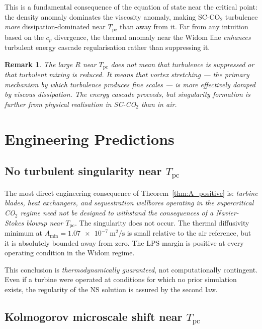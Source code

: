 \documentclass[12pt,a4paper]{article}
\newtheorem{remark}[theorem]{Remark}
\newcommand{\Tc}{T_{\mathrm{pc}}}   %
\newcommand{\Amin}{A_{\min}}
\newcommand{\sco}{SC-CO$_2$}
\begin{document}
This is a fundamental consequence of the equation of state near the critical point:
the density anomaly dominates the viscosity anomaly, making \sco{} turbulence
\emph{more} dissipation-dominated near $\Tc$ than away from it.  Far from any
intuition based on the $c_p$ divergence, the thermal anomaly near the Widom line
\emph{enhances} turbulent energy cascade regularisation rather than suppressing it.

\begin{remark}
  The large $R$ near $\Tc$ does not mean that turbulence is suppressed or that
  turbulent mixing is reduced.  It means that vortex stretching --- the primary
  mechanism by which turbulence produces fine scales --- is more effectively
  damped by viscous dissipation.  The energy cascade proceeds, but singularity
  formation is further from physical realisation in \sco{} than in air.
\end{remark}

\section{Engineering Predictions}
\label{sec:engineering}

\subsection{No turbulent singularity near $\Tc$}
\label{sec:engineering:regularity}

The most direct engineering consequence of Theorem~\ref{thm:A_positive} is:
\emph{turbine blades, heat exchangers, and sequestration wellbores operating
in the supercritical CO$_2$ regime need not be designed to withstand the
consequences of a Navier-Stokes blowup near $\Tc$}.  The singularity does not
occur.  The thermal diffusivity minimum at $\Amin = \SI{1.07e-7}{\metre\squared\per\second}$
is small relative to the air reference, but it is absolutely bounded away from zero.
The LPS margin is positive at every operating condition in the Widom regime.

This conclusion is \emph{thermodynamically guaranteed}, not computationally
contingent.  Even if a turbine were operated at conditions for which no prior
simulation exists, the regularity of the NS solution is assured by the
second law.

\subsection{Kolmogorov microscale shift near $\Tc$}
\label{sec:engineering:kolmogorov}
\end{document}
